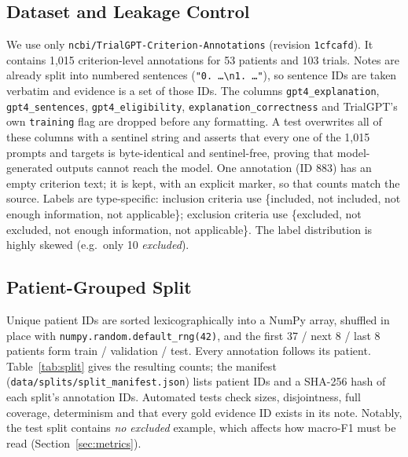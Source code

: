 \subsection{Dataset and Leakage Control}\label{sec:data}
We use only \texttt{ncbi/TrialGPT-Criterion-Annotations} (revision \texttt{1cfcafd}). It contains 1{,}015
criterion-level annotations for 53 patients and 103 trials. Notes are already split into numbered sentences
(\texttt{"0. \ldots\textbackslash n1. \ldots"}), so sentence IDs are taken verbatim and evidence is a set of
those IDs. The columns \texttt{gpt4\_explanation}, \texttt{gpt4\_sentences}, \texttt{gpt4\_eligibility},
\texttt{explanation\_correctness} and TrialGPT's own \texttt{training} flag are dropped before any formatting.
A test overwrites all of these columns with a sentinel string and asserts that every one of the 1{,}015
prompts and targets is byte-identical and sentinel-free, proving that model-generated outputs cannot reach the
model. One annotation (ID 883) has an empty criterion text; it is kept, with an explicit marker, so that
counts match the source. Labels are type-specific: inclusion criteria use \{included, not included, not
enough information, not applicable\}; exclusion criteria use \{excluded, not excluded, not enough
information, not applicable\}. The label distribution is highly skewed (e.g.\ only 10 \emph{excluded}).

\subsection{Patient-Grouped Split}\label{sec:split}
Unique patient IDs are sorted lexicographically into a NumPy array, shuffled in place with
\texttt{numpy.random.default\_rng(42)}, and the first 37 / next 8 / last 8 patients form train / validation /
test. Every annotation follows its patient. Table~\ref{tab:split} gives the resulting counts; the manifest
(\texttt{data/splits/split\_manifest.json}) lists patient IDs and a SHA-256 hash of each split's annotation
IDs. Automated tests check sizes, disjointness, full coverage, determinism and that every gold evidence ID
exists in its note. Notably, the test split contains \emph{no} \emph{excluded} example, which affects how
macro-F1 must be read (Section~\ref{sec:metrics}).


